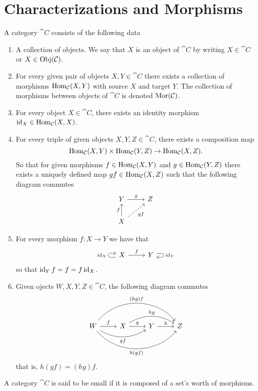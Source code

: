 \section{Characterizations and Morphisms}

\begin{definition}[Category]\label{def: category}
  A category \(\cat C\) consists of the following data
  \begin{enumerate}[(C1)]
    \item A collection of objects. We say that \(X\) is an object of \(\cat C\)
      by writing \(X \in \cat C\) or \(X \in \operatorname{Obj}(\mathcal C)\).
    \item For every given pair of objects \(X, Y \in \cat C\) there exists a
      collection of morphisms \(\operatorname{Hom}_{\mathcal C}(X, Y)\) with source \(X\) and
      target \(Y\). The collection of morphisms between objects of \(\cat C\) is
      denoted \(\operatorname{Mor}(\mathcal C)\).
    \item For every object \(X \in \cat C\), there exists an identity morphism
      \(\operatorname{id}_X \in \operatorname{Hom}_{\mathcal C}(X, X)\).
    \item For every triple of given objects \(X, Y, Z \in \cat C\), there exists
      a composition map
      \[
        \operatorname{Hom}_{\mathcal C}(X, Y) \times \operatorname{Hom}_{\mathcal C}(Y, Z) \to \operatorname{Hom}_{\mathcal C}(X, Z).
      \]
      So that for given morphisms \(f \in \operatorname{Hom}_{\mathcal C}(X, Y)\) and \(g \in
      \operatorname{Hom}_{\mathcal C}(Y, Z)\) there exists a uniquely defined map \(g  f \in
      \operatorname{Hom}_{\mathcal C}(X, Z)\) such that the following diagram commutes
      \[
        \begin{tikzcd}
          Y \ar[r, "g"]
            &Z \\
          X \ar[u, "f"] \ar[ru, dashed, swap, "g  f"]
        \end{tikzcd}
      \]
    \item For every morphism \(f: X \to Y\) we have that
      \[
        \begin{tikzcd}
          X \ar[r, "f"] \ar[loop left, "\Id_X"] &Y \ar[loop right, "\Id_Y"]
        \end{tikzcd}
      \]
      so that \(\operatorname{id}_Y  f = f = f  \operatorname{id}_X\).
    \item Given ojects \(W, X, Y, Z \in \cat C\), the following diagram commutes
      \[
        \begin{tikzcd}
          W
          \ar[r, "f"]
          \ar[rr, bend right, swap, "g  f"]
          \ar[rrr, bend right = 50, swap, "h  (g  f)"]
          \ar[rrr, bend left = 50, "(h  g)  f"]
            &X
            \ar[r, "g"] \ar[rr, bend left, "h  g"]
              &Y
              \ar[r, "h"]
                &Z
        \end{tikzcd}
      \]
      that is, \(h  (g  f) = (h  g)  f\).
  \end{enumerate} \end{definition} \begin{definition}[Small]\label{def: small cat}
  A category \(\cat C\) is said to be small if it is composed of a set's worth
  of morphisms.
\end{definition}

